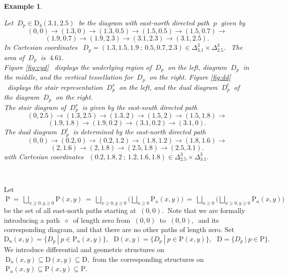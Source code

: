 \documentclass[10pt,leqeq]{article}
\newtheorem{exmp}[thm]{Example}
\begin{document}
\begin{exmp}\label{2}
{\em Let $\ D_p \in \mathrm{D}_4(3.1,2.5) \ $ be the diagram with east-north directed path $\ p\ $ given by
$$ (0,0) \rightarrow (1.3,0)  \rightarrow (1.3,0.5) \rightarrow (1.5,0.5)
\rightarrow (1.5,0.7)\rightarrow$$ 
$$ (1.9,0.7)\rightarrow (1.9,2.3)
\rightarrow (3.1,2.3) \rightarrow (3.1,2.5).$$
In Cartesian coordinates $\ \ D_p= (1.3,1.5,1.9\ ; \ 0.5,0.7,2.3) \in \Delta_{3.1}^3\times \Delta_{2.5}^3. \ \ $ 
The area of $\ D_p\ $ is $\ 4.61 .$\\

\noindent Figure \ref{fig:cyd} \ displays  the underlying region of $\ D_p \ $
on the left,  diagram $\ D_p\ $ in the middle, and the vertical tessellation for $\ D_p \ $ on the right.  Figure \ref{fig:dd}  \ displays  the stair representation $\ D_p^s \ $ on the left, and  the dual diagram $\ D_p^{t}\ $ 
of the diagram $\ D_p \ $ on the right.\\

 


\noindent The stair diagram of $\ D_p^s \ $ is given by the east-south directed path
$$(0,2.5) \rightarrow (1.3,2.5) \rightarrow (1.3,2) \rightarrow (1.5,2) \rightarrow (1.5,1.8) \rightarrow$$  
$$  (1.9,1.8) \rightarrow(1.9,0.2)\rightarrow
(3.1,0.2) \rightarrow (3.1,0).$$
The dual diagram $\ D_p^{t} \ $ is determined by the east-north directed path
$$(0,0) \rightarrow (0.2,0) \rightarrow (0.2,1.2) \rightarrow (1.8,1.2) \rightarrow (1.8,1.6) \rightarrow$$  
$$  (2,1.6) \rightarrow(2,1.8)\rightarrow
(2.5,1.8) \rightarrow (2.5,3.1).$$
with Cartesian coordinates $\ \  (0.2,1.8, 2 \ ; \ 1.2,1.6,1.8  ) \in \Delta_{2.5}^3\times \Delta_{3.1}^3. \ $

}
\end{exmp}

\



Let $\ \mathrm{P}\ = \ \bigsqcup_{ x\geq 0, y \geq 0}\mathrm{P}(x,y)\ = \ \bigsqcup_{x\geq 0, y \geq 0} 
\bigg( \bigsqcup_{n\geq 0}\mathrm{P}_n(x,y) \bigg)\ = \
\bigsqcup_{n\geq 0}  
\bigg( \bigsqcup_{x\geq 0, y \geq 0} \mathrm{P}_n(x,y) \bigg) \ $
be the set of all east-north paths starting at $\ (0,0). \ $ Note that
we are formally introducing a path $\ \diamond \ $ of length zero from $\ (0,0)\ $ to $\ (0,0),\ $ and its corresponding diagram, and that there are no other paths of length zero. Set
$$\mathrm{D}_n(x,y) = \{ D_p \ | \ p \in \mathrm{P}_n(x,y) \} ,\ \ 
 \ \mathrm{D}(x,y) = \{ D_p \ | \ p \in \mathrm{P}(x,y) \} ,\ \ \ 
 \mathrm{D} = \{ D_p \ | \ p \in \mathrm{P} \} .$$
We introduce differential and geometric structures on 
$\ \mathrm{D}_n(x,y) \subseteq  \mathrm{D}(x,y)\subseteq \mathrm{D}, $ from the corresponding structures on $\  \mathrm{P}_n(x,y) \subseteq  \mathrm{P}(x,y)\subseteq \mathrm{P}. $ \\
\end{document}
